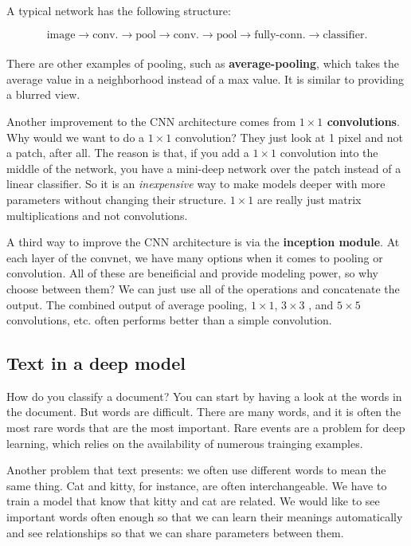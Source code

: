 A typical network has the following structure: 

\begin{equation}
	\text{image} \rightarrow \text{conv.} \rightarrow \text{pool} \rightarrow \text{conv.} \rightarrow \text{pool} \rightarrow \text{fully-conn.} \rightarrow \text{classifier}.
\end{equation}
\\

There are other examples of pooling, such as \textbf{average-pooling}, which takes the average value in a neighborhood instead of a max value. It is similar to providing a blurred view. 

Another improvement to the CNN architecture comes from \textbf{$1\times1$ convolutions}. Why would we want to do a $1\times1$ convolution? They just look at 1 pixel and not a patch, after all. The reason is that, if you add a $1\times1$ convolution into the middle of the network, you have a mini-deep network over the patch instead of a linear classifier. So it is an \textit{inexpensive} way to make models deeper with more parameters without changing their structure. $1\times1$ are really just matrix multiplications and not convolutions. 

A third way to improve the CNN architecture is via the \textbf{inception module}. At each layer of the convnet, we have many options when it comes to pooling or convolution. All of these are beneificial and provide modeling power, so why choose between them? We can just use all of the operations and concatenate the output. The combined output of average pooling, $1\times1$, $3\times3$ , and $5\times5$ convolutions, etc. often performs better than a simple convolution.

\subsection{Text in a deep model} 

How do you classify a document? You can start by having a look at the words in the document. But words are difficult. There are many words, and it is often the most rare words that are the most important. Rare events are a problem for deep learning, which relies on the availability of numerous trainging examples. 

Another problem that text presents: we often use different words to mean the same thing. Cat and kitty, for instance, are often interchangeable. We have to train a model that know that kitty and cat are related. We would like to see important words often enough so that we can learn their meanings automatically and see relationships so that we can share parameters between them. 

